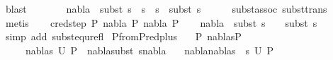 \begin{isabellebody}
\ blast\ \isanewline
\ \ \isamarkupfalse%
\isanewline
\ \ \isamarkupfalse%
\ {\isachardoublequoteopen}nabla{}\ {\isasymTurnstile}\ subst\ {\isacharparenleft}{\kern0pt}s{}\ {\isasymbullet}\ {\isacharparenleft}{\kern0pt}s{}\ {\isasymbullet}\ s{\isacharparenright}{\kern0pt}{\isacharparenright}{\kern0pt}\ {\isasymapprox}\ subst\ s{}{\isachardoublequoteclose}\isanewline
\ \ \ \ \isamarkupfalse%
\ subst{\isacharunderscore}{\kern0pt}assoc\ subst{\isacharunderscore}{\kern0pt}trans\ \isamarkupfalse%
\ metis\isanewline
{}\isamarkupfalse%
\isanewline
\ \ \isamarkupfalse%
\ {\isacharparenleft}{\kern0pt}cred{\isacharunderscore}{\kern0pt}step\ P{}\ nabla{}\ P{}\ nabla{}\ P{}{\isacharparenright}{\kern0pt}\isanewline
\ \ \isamarkupfalse%
\ {\isachardoublequoteopen}nabla{}\ {\isasymTurnstile}\ subst\ {\isacharparenleft}{\kern0pt}s{}\ {\isasymbullet}\ {\isacharbrackleft}{\kern0pt}{\isacharbrackright}{\kern0pt}{\isacharparenright}{\kern0pt}\ {\isasymapprox}\ subst\ s{}{\isachardoublequoteclose}\isanewline
\ \ \ \ \isamarkupfalse%
\ {\isacharparenleft}{\kern0pt}simp\ add{\isacharcolon}{\kern0pt}\ subst{\isacharunderscore}{\kern0pt}equ{\isacharunderscore}{\kern0pt}refl{\isacharparenright}{\kern0pt}\isanewline
{}\isamarkupfalse%
%
\endisatagproof
{\isafoldproof}%
%
\isadelimproof
\isanewline
%
\endisadelimproof
\isanewline
{}\isamarkupfalse%
\ P{}{\isacharunderscore}{\kern0pt}from{\isacharunderscore}{\kern0pt}P{}{\isacharunderscore}{\kern0pt}red{\isacharunderscore}{\kern0pt}plus{\isacharcolon}{\kern0pt}\isanewline
\ \ \ {\isachardoublequoteopen}P{}\ {\isasymTurnstile}{\isacharparenleft}{\kern0pt}nabla{\isacharcomma}{\kern0pt}s{\isacharparenright}{\kern0pt}{\isasymRightarrow}P{}{\isachardoublequoteclose}\isanewline
\ \ \ \ \ {\isachardoublequoteopen}{\isacharparenleft}{\kern0pt}nabla{}{\isacharcomma}{\kern0pt}s{}{\isacharparenright}{\kern0pt}{\isasymin}\ U\ P{}{\isachardoublequoteclose}\ \ {\isachardoublequoteopen}nabla{}{\isasymTurnstile}{\isacharparenleft}{\kern0pt}subst\ s{}{\isacharparenright}{\kern0pt}{\isacharparenleft}{\kern0pt}nabla{\isacharparenright}{\kern0pt}{\isachardoublequoteclose}\isanewline
\ \ \ {\isachardoublequoteopen}{\isacharparenleft}{\kern0pt}nabla{}{\isasymunion}nabla{}{\isacharcomma}{\kern0pt}{\isacharparenleft}{\kern0pt}s{}\ {\isasymbullet}\ s{\isacharparenright}{\kern0pt}{\isacharparenright}{\kern0pt}{\isasymin}\ U\ P{}{\isachardoublequoteclose}\isanewline

\end{isabellebody}
